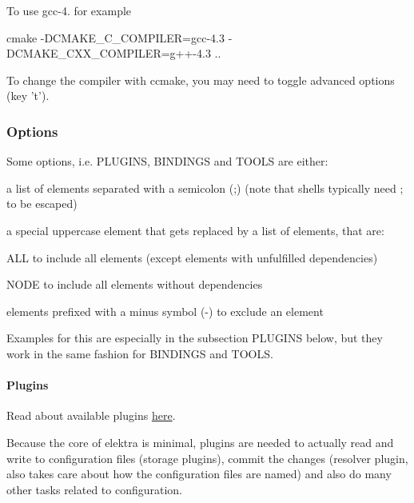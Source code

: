 To use gcc-\/4. for example \begin{DoxyVerb}cmake -DCMAKE_C_COMPILER=gcc-4.3 -DCMAKE_CXX_COMPILER=g++-4.3 ..
\end{DoxyVerb}


To change the compiler with ccmake, you may need to toggle advanced options (key 't').

\subsubsection*{Options}

Some options, i.\+e. {\ttfamily P\+L\+U\+G\+I\+N\+S}, {\ttfamily B\+I\+N\+D\+I\+N\+G\+S} and {\ttfamily T\+O\+O\+L\+S} are either\+:


\begin{DoxyItemize}
\item a list of elements separated with a semicolon ({\ttfamily ;}) (note that shells typically need {\ttfamily ;} to be escaped)
\item a special uppercase element that gets replaced by a list of elements, that are\+:
\begin{DoxyItemize}
\item {\ttfamily A\+L\+L} to include all elements (except elements with unfulfilled dependencies)
\item {\ttfamily N\+O\+D\+E} to include all elements without dependencies
\end{DoxyItemize}
\item elements prefixed with a minus symbol ({\ttfamily -\/}) to exclude an element
\end{DoxyItemize}

Examples for this are especially in the subsection {\ttfamily P\+L\+U\+G\+I\+N\+S} below, but they work in the same fashion for {\ttfamily B\+I\+N\+D\+I\+N\+G\+S} and {\ttfamily T\+O\+O\+L\+S}.

\paragraph*{Plugins}

Read about available plugins \hyperlink{md_src_plugins_README_src_plugins_README_md}{here}.

Because the core of elektra is minimal, plugins are needed to actually read and write to configuration files (storage plugins), commit the changes (resolver plugin, also takes care about how the configuration files are named) and also do many other tasks related to configuration.

